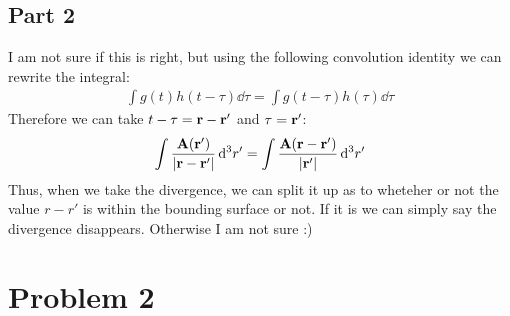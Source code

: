 \documentclass[12pt]{article}
\begin{document}
\subsection*{Part 2}
I am not sure if this is right, but using the following convolution identity we can rewrite the integral:
\begin{gather*}
  \int g(t)h(t-\tau)\dd{\tau}=\int g(t-\tau)h(\tau)\dd{\tau}
\end{gather*}
Therefore we can take $t-\tau=\vb{r}-\vb{r}'$ and $\tau=\vb{r}'$:
\begin{align*}
  \int\frac{\vb{A}(\vb{r'})}{\abs{\vb{r-r'}}}\dd[3]{r'}=
  \int\frac{\vb{A}(\vb{r-r'})}{\abs{\vb{r'}}}\dd[3]{r'}
\end{align*}
Thus, when we take the divergence, we can split it up as to wheteher or not the value $r-r'$ is within the bounding surface or not. If it is we can simply say the divergence disappears. Otherwise I am not sure :)
\section*{Problem 2}
\end{document}
